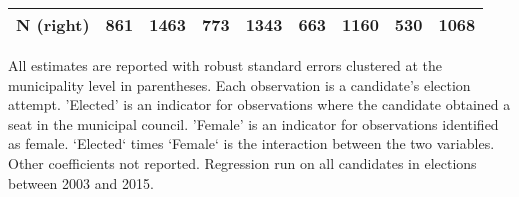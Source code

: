 \begin{table}[!h]
\begin{threeparttable}
\begin{tabular}[t]{lcccccccc}
N (right) & \multicolumn{1}{c}{861} & \multicolumn{1}{c}{1463} & \multicolumn{1}{c}{773} & \multicolumn{1}{c}{1343} & \multicolumn{1}{c}{663} & \multicolumn{1}{c}{1160} & \multicolumn{1}{c}{530} & \multicolumn{1}{c}{1068}\\
\bottomrule
\end{tabular}
\begin{tablenotes}[para]
\item All estimates are reported with robust standard errors clustered at the municipality level in parentheses. Each observation is a candidate's election attempt. 'Elected' is an indicator for observations where the candidate obtained a seat in the municipal council. 'Female' is an indicator for observations identified as female. `Elected` times `Female` is the interaction between the two variables. Other coefficients not reported. Regression run on all candidates in elections between 2003 and 2015.
\end{tablenotes}
\end{threeparttable}
\end{table}
